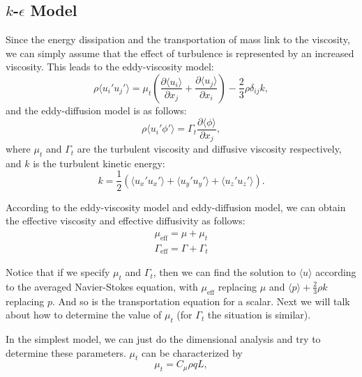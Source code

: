\documentclass[english, nochinese]{pkupaper}
\begin{document}
\subsection{$k$-$\epsilon$ Model}
\par Since the energy dissipation and the transportation of mass link to the viscosity, we can simply assume that the effect of turbulence is represented by an increased viscosity. This leads to the eddy-viscosity model:
\begin{equation}
	\rho\langle u_i'u_j'\rangle = \mu_t\left(\frac{\partial\langle u_i\rangle}{\partial x_j} + \frac{\partial\langle u_j\rangle}{\partial x_i}\right) - \frac{2}{3}\rho\delta_{ij}k,
\end{equation}
and the eddy-diffusion model is as follows:
\begin{equation}
	\rho\langle u_i'\phi'\rangle = \Gamma_t\frac{\partial\langle\phi\rangle}{\partial x_j},
\end{equation}
where $\mu_t$ and $\Gamma_t$ are the turbulent viscosity and diffusive viscosity respectively, and $k$ is the turbulent kinetic energy:
\begin{equation}
	k = \frac{1}{2}(\langle u_x'u_x'\rangle + \langle u_y'u_y'\rangle + \langle u_z'u_z'\rangle).
\end{equation}
\par According to the eddy-viscosity model and eddy-diffusion model, we can obtain the effective viscosity and effective diffusivity as follows:
\begin{equation}
	\begin{aligned}
		\mu_{\mathrm{eff}} = \mu + \mu_t\\
		\Gamma_{\mathrm{eff}} = \Gamma + \Gamma_t
	\end{aligned}
\end{equation}
\par Notice that if we specify $\mu_t$ and $\Gamma_t$, then we can find the solution to $\langle u\rangle$ according to the averaged Navier-Stokes equation, with $\mu_\mathrm{eff}$ replacing $\mu$ and $\langle p\rangle + \frac{2}{3}\rho k$ replacing $p$. And so is the transportation equation for a scalar. Next we will talk about how to determine the value of $\mu_t$ (for $\Gamma_t$ the situation is similar).
\par In the simplest model, we can just do the dimensional analysis and try to determine these parameters. $\mu_t$ can be characterized by
\begin{equation}
	\mu_t = C_{\mu}\rho qL,
\end{equation}
\end{document}
